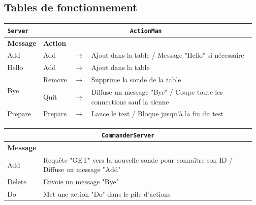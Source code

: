 \documentclass[a4paper,11pt]{article}
\newcommand{\cd}[1]{\texttt{#1}}
\begin{document}
\FloatBarrier

\subsection{Tables de fonctionnement}

\begin{center}
\begin{tabular}{|l|l|c|l|}
\hline
\cd{Server} & \multicolumn{3}{|c|}{\cd{ActionMan}} \\
\hline
\textbf{Message} & \textbf{Action} & & \\
\hline
Add & Add & $\longrightarrow$ & Ajout dans la table / Message "Hello" si nécessaire\\
\hline
Hello & Add & $\longrightarrow$ & Ajout dans la table\\
\hline
\multirow{2}{*}{Bye} & Remove & $\longrightarrow$ & Supprime la sonde de la table\\
\cline{2-4}
 & Quit & $\longrightarrow$ & Diffuse un message "Bye" / Coupe toute les connections sauf la sienne\\
\hline
Prepare & Prepare & $\longrightarrow$ & Lance le test / Bloque jusqu'à la fin du test \\
\hline
\end{tabular}
\end{center}

\begin{center}
\begin{tabular}{|l|l|}
\hline
\multicolumn{2}{|c|}{\cd{CommanderServer}} \\
\hline
\textbf{Message} & \\
\hline
Add & Requête "GET" vers la nouvelle sonde pour connaître son ID / Diffuse un message "Add" \\
\hline
Delete & Envoie un message "Bye"\\
\hline
Do & Met une action "Do" dans le pile d'actions\\
\hline
\end{tabular}
\end{center}
\end{document}
